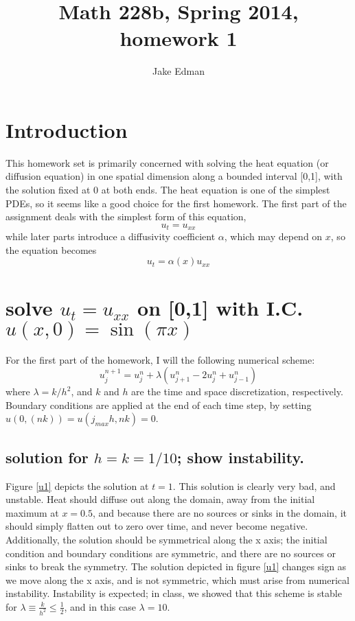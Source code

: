 \documentclass[11pt]{amsart}
\title{Math 228b, Spring 2014, homework 1}
\author{Jake Edman}
\date{}                                           %
\begin{document}
\maketitle
\section{Introduction}
This homework set is primarily concerned with solving the heat equation (or diffusion equation) in one spatial dimension along a bounded interval [0,1], with the solution fixed at 0 at both ends. The heat equation is one of the simplest PDEs, so it seems like a good choice for the first homework. 
The first part of the assignment deals with the simplest form of this equation, 
\begin{equation} 
u_t =u_{xx} 
\end{equation} 
while later parts introduce a diffusivity coefficient $\alpha$, which may depend on $x$, so the equation becomes
\begin{equation} 
u_t = \alpha(x) u_{xx}
\end{equation} 


\section{solve $u_t = u_{xx}$ on [0,1] with I.C. $u(x,0)= \sin(\pi x)$}

For the first part of the homework, I will the following numerical scheme: 
\begin{equation} 
u_j^{n+1} = u_j^n + \lambda (u_{j+1}^n - 2u_j^n + u_{j-1}^n)
\end{equation}\label{scheme} 
where $\lambda = k/h^2$, and $k$ and $h$ are the time and space discretization, respectively.  Boundary conditions are applied at the end of each time step, by setting $u(0,(nk)) = u(j_{max}h, nk) = 0$.


\subsection{solution for $h=k=1/10$; show instability. }
Figure \ref{u1} depicts the solution at $t=1$.  This solution is clearly very bad, and unstable. Heat should diffuse out along the domain, away from the initial maximum at $x=0.5$, and because there are no sources or sinks in the domain, it should simply flatten out to zero over time, and never become negative.  Additionally, the solution should be symmetrical along the x axis; the initial condition and boundary conditions are symmetric, and there are no sources or sinks to break the symmetry. The solution depicted in figure \ref{u1} changes sign as we move along the x axis, and is not symmetric, which must arise from  numerical instability. Instability is expected; in class, we showed that this scheme is stable for $\lambda \equiv \frac{k}{h^2} \le \frac{1}{2}$, and in this case $\lambda = 10$. 
\end{document}
